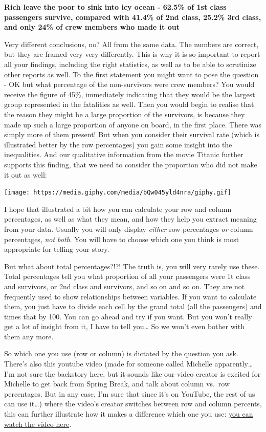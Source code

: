 \documentclass[]{book}
\theoremstyle{definition}
\theoremstyle{definition}
\theoremstyle{definition}
\theoremstyle{remark}
\begin{document}
\textbf{Rich leave the poor to sink into icy ocean - 62.5\% of 1st class
passengers survive, compared with 41.4\% of 2nd class, 25.2\% 3rd class,
and only 24\% of crew members who made it out}

Very different conclusions, no? All from the same data. The numbers are
correct, but they are framed very very differently. This is why it is so
important to report all your findings, including the right statistics,
as well as to be able to scrutinize other reports as well. To the first
statement you might want to pose the question - OK but what percentage
of the non-survivors were crew members? You would receive the figure of
45\%, immediately indicating that they would be the largest group
represented in the fatalities as well. Then you would begin to realise
that the reason they might be a large proportion of the survivors, is
because they made up such a large proportion of anyone on board, in the
first place. There was simply more of them present! But when you
consider their survival rate (which is illustrated better by the row
percentages) you gain some insight into the inequalities. And our
qualitative information from the movie Titanic further supports this
finding, that we need to consider the proportion who did not make it out
as well:

\texttt{[image: https://media.giphy.com/media/bQw045yld4nra/giphy.gif]}

I hope that illustrated a bit how you can calculate your row and column
percentages, as well as what they mean, and how they help you extract
meaning from your data. Usually you will only display \emph{either} row
percentages \emph{or} column percentages, \emph{not both}. You will have
to choose which one you think is most appropriate for telling your
story.

But what about total percentages?!?! The truth is, you will very rarely
use these. Total percentages tell you what proportion of all your
passengers were 1t class and survivors, or 2nd class and survivors, and
so on and so on. They are not frequently used to show relationships
between variables. If you want to calculate them, you just have to
divide each cell by the grand total (all the passengers) and times that
by 100. You can go ahead and try if you want. But you won't really get a
lot of insight from it, I have to tell you\ldots{} So we won't even
bother with them any more.

So which one you use (row or column) is dictated by the question you
ask. There's also this youtube video (made for someone called Michelle
apparently\ldots{} I'm not sure the backstory here, but it sounds like
our video creator is excited for Michelle to get back from Spring Break,
and talk about column vs.~row percentages. But in any case, I'm sure
that since it's on YouTube, the rest of us can use it\ldots{}) where the
video's creator switches between row and column percents, this can
further illustrate how it makes a difference which one you use:
\href{https://www.youtube.com/watch?v=cdvTpnHwKjs}{you can watch the
video here}.
\end{document}
